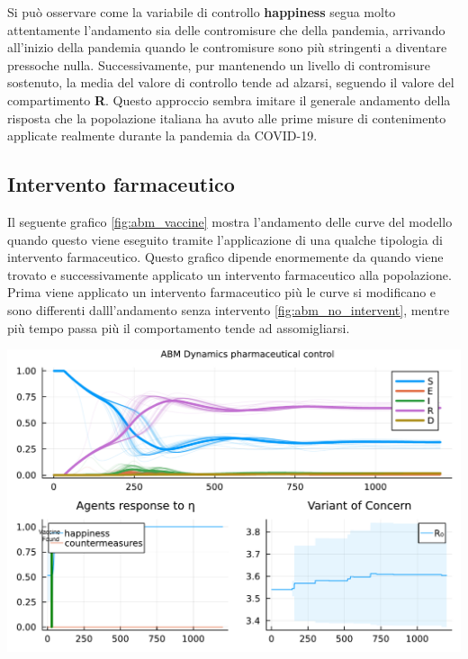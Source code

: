 Si può osservare come la variabile di controllo \textbf{happiness} segua molto attentamente l'andamento sia delle 
contromisure che della pandemia, arrivando all'inizio della pandemia quando le contromisure sono più stringenti 
a diventare pressoche nulla. Successivamente, pur mantenendo un livello di contromisure sostenuto, la media
del valore di controllo tende ad alzarsi, seguendo il valore del compartimento \textbf{R}. Questo approccio sembra 
imitare il generale andamento della risposta che la popolazione italiana ha avuto alle prime misure di contenimento 
applicate realmente durante la pandemia da COVID-19.
\newpage

\subsection{Intervento farmaceutico}
Il seguente grafico \ref{fig:abm_vaccine} mostra l'andamento delle curve del modello
quando questo viene eseguito tramite l'applicazione di una qualche tipologia di intervento farmaceutico.
Questo grafico dipende enormemente da quando viene trovato e successivamente applicato un intervento 
farmaceutico alla popolazione. Prima viene applicato un intervento farmaceutico più le curve si modificano 
e sono differenti dalll'andamento senza intervento \ref{fig:abm_no_intervent}, mentre più tempo passa più
il comportamento tende ad assomigliarsi.

\begin{minipage}{\linewidth}
	\centering
	\includegraphics[width=\textwidth]{img/SocialNetworkABM_VACCINE.pdf}
	\label{fig:abm_vaccine}
\end{minipage}

